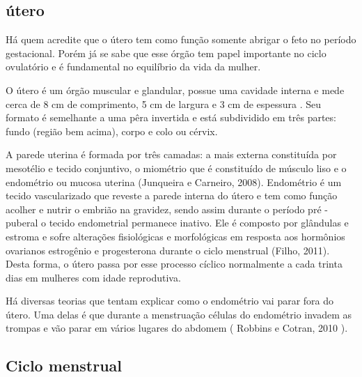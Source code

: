 \documentclass[12pt]{article} %
\begin{document}
\subsection{útero}



Há quem acredite que o útero tem como função somente abrigar o feto no período gestacional. Porém já se sabe que esse órgão tem papel importante no ciclo ovulatório e é fundamental no equilíbrio da vida da mulher.

O útero é um órgão muscular e glandular, possue uma cavidade interna e mede cerca de 8 cm de comprimento, 5 cm de largura e 3 cm de espessura . Seu formato é semelhante a uma pêra invertida e está subdividido em três partes: fundo (região bem acima), corpo e colo ou cérvix.  

A parede uterina é formada por três camadas: a mais externa constituída por mesotélio e tecido conjuntivo, o miométrio que é constituído de músculo liso e o endométrio ou mucosa uterina (Junqueira e Carneiro, 2008). Endométrio é um tecido vascularizado que reveste a parede interna do útero e tem como função acolher e nutrir o embrião na gravidez, sendo assim durante o período pré -puberal o tecido endometrial permanece inativo. Ele é composto por glândulas e estroma e sofre alterações fisiológicas e morfológicas em resposta aos hormônios ovarianos estrogênio e progesterona durante o ciclo menstrual (Filho, 2011).
Desta forma, o útero passa por esse processo cíclico normalmente a cada trinta dias em mulheres com idade reprodutiva.

Há diversas teorias que tentam explicar como o endométrio vai parar fora do útero. Uma delas é que durante a menstruação células do endométrio invadem as trompas e vão parar em vários lugares do abdomem ( Robbins e Cotran, 2010 ).


\subsection{Ciclo menstrual}
\end{document}
